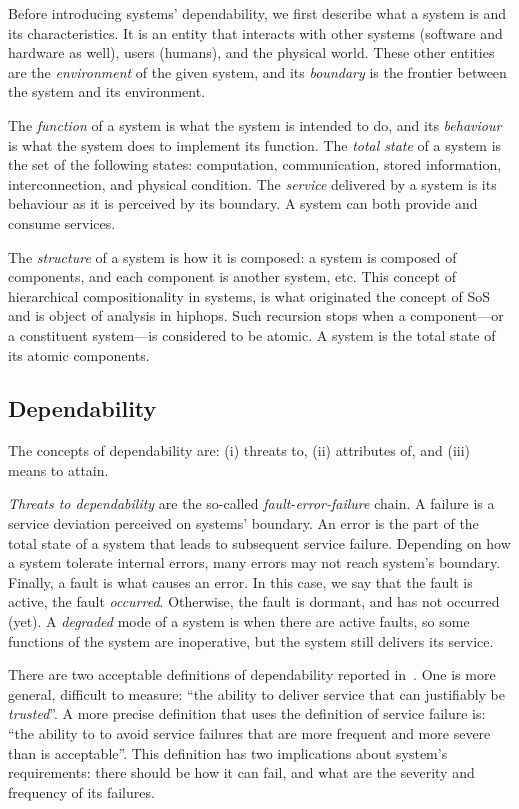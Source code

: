 \documentclass[en,twoside,onehalfspacing,phd]{risethesis}
\begin{document}
Before introducing systems' dependability, we first describe what a system is and its characteristics.
It is an entity that interacts with other systems (software and hardware as well), users (humans), and the physical world.
These other entities are the \emph{environment} of the given system, and its \emph{boundary} is the frontier between the system and its environment.

The \emph{function} of a system is what the system is intended to do, and its \emph{behaviour} is what the system does to implement its function.
The \emph{total state} of a system is the set of the following states: computation, communication, stored information, interconnection, and physical condition.
The \emph{service} delivered by a system is its behaviour as it is perceived by its boundary.
A system can both provide and consume services.

The \emph{structure} of a system is how it is composed: a system is composed of components, and each component is another system, etc.
This concept of hierarchical compositionality in systems, is what originated the concept of \ac{SoS} and is object of analysis in \ac{hiphops}.
Such recursion stops when a component---or a constituent system---is considered to be atomic.
A system is the total state of its atomic components.

\subsection{Dependability}

The concepts of dependability are: (i) threats to, (ii) attributes of, and (iii) means to attain.

\emph{Threats to dependability} are the so-called \emph{fault-error-failure} chain.
A failure is a service deviation perceived on systems' boundary.
An error is the part of the total state of a system that leads to subsequent service failure.
Depending on how a system tolerate internal errors, many errors may not reach system's boundary.
Finally, a fault is what causes an error.
In this case, we say that the fault is active, the fault \emph{occurred}.
Otherwise, the fault is dormant, and has not occurred (yet).
A \emph{degraded} mode of a system is when there are active faults, so some functions of the system are inoperative, but the system still delivers its service.

There are two acceptable definitions of dependability reported in~\cite{ALR+2004}.
One is more general, difficult to measure: ``the ability to deliver service that can justifiably be \emph{trusted}''.
A more precise definition that uses the definition of service failure is: ``the ability to to avoid service failures that are more frequent and more severe than is acceptable''.
This definition has two implications about system's requirements: there should be how it can fail, and what are the severity and frequency of its failures.
\end{document}
